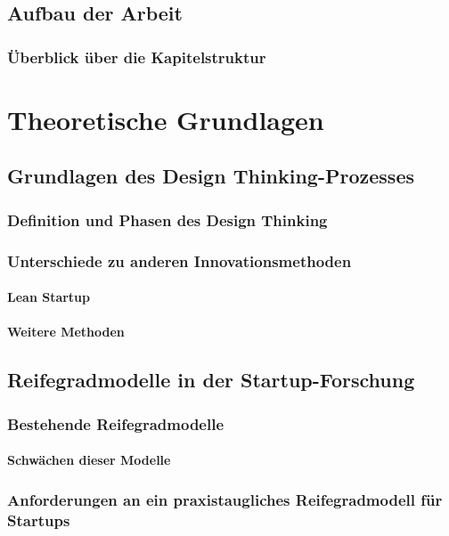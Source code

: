 \section{Aufbau der Arbeit}
\subsection{Überblick über die Kapitelstruktur}

\chapter{Theoretische Grundlagen}

\section{Grundlagen des Design Thinking-Prozesses}
\subsection{Definition und Phasen des Design Thinking}
\subsection{Unterschiede zu anderen Innovationsmethoden}
\subsubsection{Lean Startup}
\subsubsection{Weitere Methoden}

\section{Reifegradmodelle in der Startup-Forschung}
\subsection{Bestehende Reifegradmodelle}
\subsubsection{Schwächen dieser Modelle}
\subsection{Anforderungen an ein praxistaugliches Reifegradmodell für Startups}

